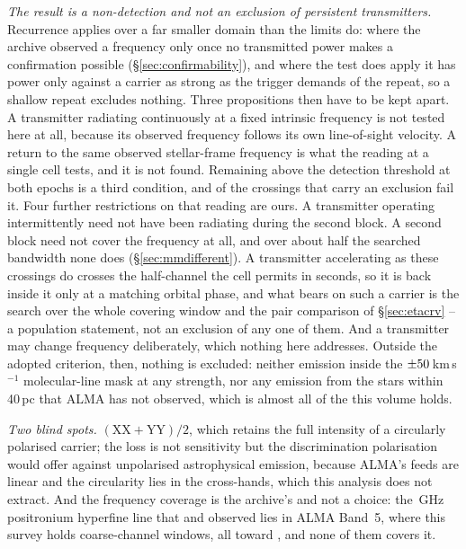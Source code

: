 \noindent\emph{The result is a non-detection and not an exclusion of
persistent transmitters.} Recurrence applies over a far smaller domain than
the limits do: where the archive observed a frequency only once no
transmitted power makes a confirmation possible
(\S\ref{sec:confirmability}), and where the test does apply it has power
only against a carrier as strong as the trigger demands of the repeat, so a
shallow repeat excludes nothing. Three propositions then have to be kept
apart. A
transmitter radiating continuously at a fixed intrinsic frequency is not
tested here at all, because its observed frequency follows its own
line-of-sight velocity. A return to the same observed stellar-frame frequency
is what the reading at a single cell tests, and it is not found. Remaining
above the detection threshold at both epochs is a third condition, and
\HjNPowerLo{} of the \RcNExcl{} crossings that carry an exclusion fail
it. Four further restrictions on that reading are ours. A transmitter
operating intermittently need not have been radiating during the second
block. A second block need not cover the frequency at all, and over about
half the searched bandwidth none does (\S\ref{sec:mmdifferent}). A
transmitter accelerating as these crossings do crosses the half-channel the
cell permits in seconds, so it is back inside it only at a matching orbital
phase, and what bears on such a carrier is the search over the whole covering
window and the pair comparison of \S\ref{sec:etacrv} -- a population
statement, not an exclusion of any one of them. And a transmitter may change
frequency deliberately, which nothing here addresses. Outside the adopted criterion, then, nothing
is excluded: neither emission inside the
$\pm50$\,km\,s$^{-1}$ molecular-line mask at any strength, nor any
emission from the stars within 40\,pc that ALMA has not
observed, which is almost all of the \NGaiaCensus{} this volume holds.

\noindent\emph{Two blind spots.}
$(\mathrm{XX}+\mathrm{YY})/2$, which retains the full intensity of a circularly polarised
carrier; the loss is not sensitivity but the discrimination
polarisation would offer against unpolarised astrophysical emission, because ALMA's feeds
are linear and the circularity lies in the cross-hands, which this analysis
does not extract. And the frequency coverage is the archive's and not a
choice: the \SbPriorFreqGHz\,GHz positronium hyperfine line that
\citet{Steffes1994} and \citet{Mauersberger1996} observed lies in ALMA Band~5,
where this survey holds
\LnBFiveWin{} coarse-channel windows, all toward \LnBFiveStars, and none of
them covers it.

